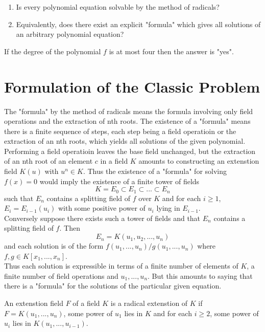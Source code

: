
\begin{enumerate}
\item Is every polynomial equation solvable by the method of radicals?
\item Equivalently, does there exist an explicit "formula" which gives all solutions of an arbitrary polynomial equation?
\end{enumerate}

If the degree of  the polynomial \(f\) is at most four then the answer is "yes".

\section{Formulation of the Classic Problem}
The "formula" by the method of radicals means the formula involving only field operations and the extraction of nth roots.
The existence of a "formula" means there is a finite sequence of steps, each step being a field operatioin or the extraction of an nth roots, which yields all solutions of the given polynomial.
Performing a field operatioin leaves the base field unchanged, but the extraction of an nth root of an element
\(c\) in a field \(K\) amounts to constructing an extenstion field \(K(u)\) with \(u^n \in K\). Thus the existence of a "formula" for solving \(f(x)=0\) would imply
the existence of a finite tower of fields
\[K=E_0 \subset E_1 \subset ... \subset E_n\]
such that \(E_n\) contains a splitting field of \(f\) over \(K\) and for each \(i \geq 1\), \(E_i=E_{i-1}(u_i)\) with some positive power of \(u_i\) lying in \(E_{i-1}\).\\
Conversely suppose there exists such a tower of fields and that \(E_n\) contains a splitting field of \(f\). Then
\[E_n = K(u_1,u_2,...,u_n)\]
and each solution is of the form \(f(u_1,...,u_n)/g(u_1,...,u_n)\) where \(f,g \in K[x_1,...,x_n]\). \\
Thus each solution is expressible in terms of a finite number of elements of \(K\), a finite number of field operations and \(u_1,...,u_n\). But
this amounts to saying that there is a "formula" for the solutions of the particular given equation. \\

\begin{definition}
An extenstion field \(F\) of a field \(K\) is a radical extenstion of \(K\) if \(F=K(u_1,...,u_n)\), some power of \(u_1\) lies in \(K\) and for each \(i \geq 2\), some power of \(u_i\) lies in \(K(u_1,...,u_{i-1})\).
\end{definition}

